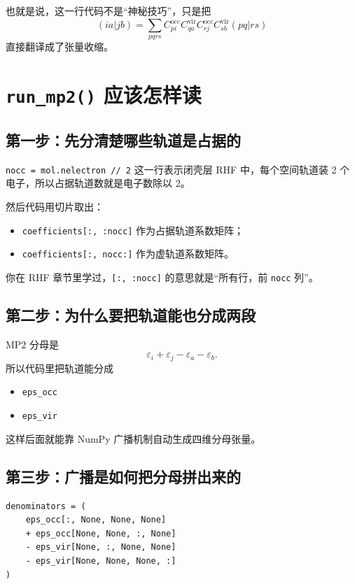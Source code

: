 \documentclass[UTF8,11pt,fontset=fandol]{ctexbook}
\begin{document}
也就是说，这一行代码不是“神秘技巧”，只是把
\begin{equation}
(ia|jb)
=
\sum_{pqrs}
C_{pi}^{\mathrm{occ}}
C_{qa}^{\mathrm{vir}}
C_{rj}^{\mathrm{occ}}
C_{sb}^{\mathrm{vir}}
(pq|rs)
\end{equation}
直接翻译成了张量收缩。

\section{\texttt{run\_mp2()} 应该怎样读}

\subsection*{第一步：先分清楚哪些轨道是占据的}

\texttt{nocc = mol.nelectron // 2} 这一行表示闭壳层 RHF 中，每个空间轨道装 2 个电子，所以占据轨道数就是电子数除以 2。

然后代码用切片取出：
\begin{itemize}
  \item \texttt{coefficients[:, :nocc]} 作为占据轨道系数矩阵；
  \item \texttt{coefficients[:, nocc:]} 作为虚轨道系数矩阵。
\end{itemize}

你在 RHF 章节里学过，\texttt{[:, :nocc]} 的意思就是“所有行，前 \texttt{nocc} 列”。

\subsection*{第二步：为什么要把轨道能也分成两段}

MP2 分母是
\begin{equation}
\varepsilon_i+\varepsilon_j-\varepsilon_a-\varepsilon_b.
\end{equation}
所以代码里把轨道能分成
\begin{itemize}
  \item \texttt{eps\_occ}
  \item \texttt{eps\_vir}
\end{itemize}
这样后面就能靠 NumPy 广播机制自动生成四维分母张量。

\subsection*{第三步：广播是如何把分母拼出来的}

\begin{lstlisting}[style=pythonstyle]
denominators = (
    eps_occ[:, None, None, None]
    + eps_occ[None, None, :, None]
    - eps_vir[None, :, None, None]
    - eps_vir[None, None, None, :]
)
\end{lstlisting}
\end{document}
